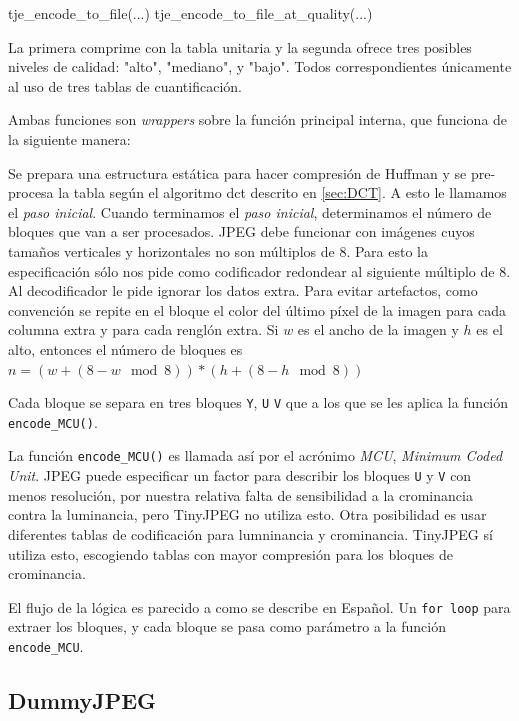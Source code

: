 \begin{code}[language=C][h]
tje_encode_to_file(...)
tje_encode_to_file_at_quality(...)
\end{code}

La primera comprime con la tabla unitaria y la segunda ofrece tres posibles
niveles de calidad: "alto", "mediano", y "bajo". Todos correspondientes
únicamente al uso de tres tablas de cuantificación.

Ambas funciones son \emph{wrappers} sobre la función principal
interna, que funciona de la siguiente manera:

Se prepara una estructura estática para hacer compresión de Huffman y se
pre-procesa la tabla según el algoritmo dct descrito en \ref{sec:DCT}. A esto
le llamamos el \emph{paso inicial}.  Cuando terminamos el \emph{paso inicial},
determinamos el número de bloques que van a ser procesados. JPEG debe funcionar
con imágenes cuyos tamaños verticales y horizontales no son múltiplos de 8.
Para esto la especificación sólo nos pide como codificador redondear al
siguiente múltiplo de 8. Al decodificador le pide ignorar los datos extra. Para
evitar artefactos, como convención se repite en el bloque el color del último
píxel de la imagen para cada columna extra y para cada renglón extra. Si $w$ es
el ancho de la imagen y $h$ es el alto, entonces el número de bloques es $n =
(w + (8 - w \mod 8)) * (h + (8 - h \mod 8))$

Cada bloque se separa en tres bloques \verb+Y+, \verb+U+ \verb+V+ que a los que
se les aplica la función \verb+encode_MCU()+.

La función \verb+encode_MCU()+ es llamada así por el acrónimo \emph{MCU},
\emph{Minimum Coded Unit}. JPEG puede especificar un factor para describir los
bloques \verb+U+ y \verb+V+ con menos resolución, por nuestra relativa falta de
sensibilidad a la crominancia contra la luminancia, pero TinyJPEG no utiliza
esto. Otra posibilidad es usar diferentes tablas de codificación para
lumninancia y crominancia. TinyJPEG sí utiliza esto, escogiendo tablas con
mayor compresión para los bloques de crominancia.

El flujo de la lógica es parecido a como se describe en Español.
Un \verb+for loop+ para extraer los bloques, y cada bloque se pasa como
parámetro a la función \verb+encode_MCU+.

\subsection{DummyJPEG} \label{sub:dummy}

